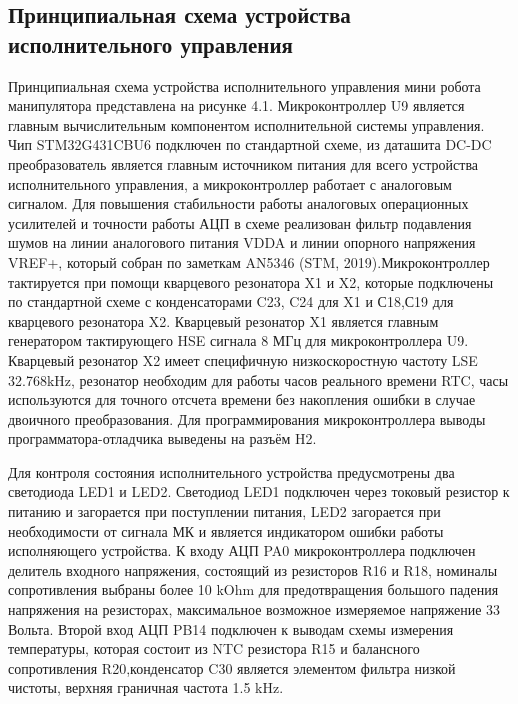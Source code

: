

\subsection{Принципиальная схема устройства исполнительного управления }

Принципиальная схема устройства исполнительного управления мини робота манипулятора представлена на рисунке 4.1. Микроконтроллер U9 является главным вычислительным компонентом исполнительной системы управления. Чип STM32G431CBU6 подключен по стандартной схеме, из даташита \citep{STM32G431}DC-DC преобразователь является главным источником питания для всего устройства исполнительного управления, а микроконтроллер работает с аналоговым сигналом. Для повышения стабильности работы аналоговых операционных усилителей и точности работы АЦП  в схеме реализован фильтр подавления шумов на линии аналогового питания VDDA и линии опорного напряжения VREF+, который собран по заметкам AN5346 (STM, 2019).Микроконтроллер тактируется при помощи кварцевого резонатора X1 и X2, которые подключены по стандартной схеме с конденсаторами C23, C24 для X1 и С18,С19 для кварцевого резонатора X2. Кварцевый резонатор X1 является  главным генератором тактирующего HSE сигнала 8 МГц для микроконтроллера U9. Кварцевый резонатор X2 имеет специфичную  низкоскоростную частоту LSE 32.768kHz, резонатор необходим для работы часов реального времени RTC, часы используются для точного отсчета времени без накопления ошибки в случае двоичного преобразования. Для программирования микроконтроллера выводы программатора-отладчика выведены на разъём H2.

Для контроля состояния исполнительного устройства предусмотрены два светодиода LED1 и LED2. Светодиод LED1 подключен через токовый резистор к питанию и загорается при поступлении питания, LED2 загорается при необходимости от сигнала МК и является индикатором ошибки работы исполняющего устройства.  К входу АЦП PA0 микроконтроллера подключен делитель входного напряжения, состоящий из резисторов R16 и R18, номиналы сопротивления выбраны более 10 kOhm для предотвращения большого падения напряжения на резисторах, максимальное возможное измеряемое напряжение 33 Вольта. Второй вход АЦП PB14 подключен к выводам схемы измерения температуры, которая состоит из NTC резистора R15 и балансного сопротивления R20,конденсатор C30 является элементом фильтра низкой чистоты, верхняя граничная частота  1.5 kHz.

